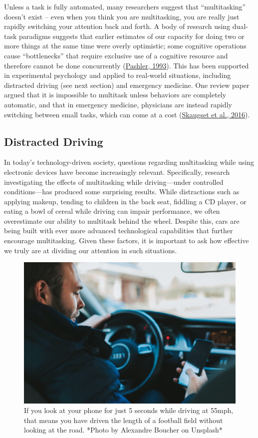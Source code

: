 \documentclass[
]{krantz}
\begin{document}
Unless a task is fully automated, many researchers suggest that ``multitasking'' doesn't exist -- even when you think you are multitasking, you are really just rapidly switching your attention back and forth. A body of research using dual-task paradigms suggests that earlier estimates of our capacity for doing two or more things at the same time were overly optimistic; some cognitive operations cause ``bottlenecks'' that require exclusive use of a cognitive resource and therefore cannot be done concurrently (\protect\hyperlink{ref-Pashler1993}{Pashler, 1993}). This has been supported in experimental psychology and applied to real-world situations, including distracted driving (see next section) and emergency medicine. One review paper argued that it is impossible to multitask unless behaviors are completely automatic, and that in emergency medicine, physicians are instead rapidly switching between small tasks, which can come at a cost (\protect\hyperlink{ref-Skaugset2016}{Skaugset et al., 2016}).

\hypertarget{distracted-driving}{%
\subsection*{Distracted Driving}\label{distracted-driving}}


In today's technology-driven society, questions regarding multitasking while using electronic devices have become increasingly relevant. Specifically, research investigating the effects of multitasking while driving---under controlled conditions---has produced some surprising results. While distractions such as applying makeup, tending to children in the back seat, fiddling a CD player, or eating a bowl of cereal while driving can impair performance, we often overestimate our ability to multitask behind the wheel. Despite this, cars are being built with ever more advanced technological capabilities that further encourage multitasking. Given these factors, it is important to ask how effective we truly are at dividing our attention in such situations.

\begin{figure}

{\centering \includegraphics[width=0.5\linewidth]{images/ch3/fig7} 

}

\caption{If you look at your phone for just 5 seconds while driving at 55mph, that means you have driven the length of a football field without looking at the road. *Photo by Alexandre Boucher on Unsplash*}\label{fig:driving}
\end{figure}
\end{document}
